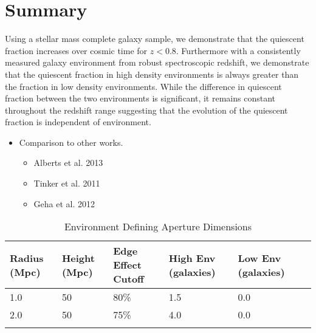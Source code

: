 \documentclass{emulateapj}
\begin{document}
\section{Summary} \label{sec:summary}
Using a stellar mass complete galaxy sample, we demonstrate that the quiescent fraction increases over cosmic time for $z < 0.8$. Furthermore with a consistently measured galaxy environment from robust spectroscopic redshift, we demonstrate that the quiescent fraction in high density environments is always greater than the fraction in low density environments. While the difference in quiescent fraction between the two environments is significant, it remains constant throughout the redshift range suggesting that the evolution of the quiescent fraction is independent of environment. 

\begin{itemize}
    \item Comparison to other works. 
    \begin{itemize}
        \item Alberts et al. 2013 
        \item Tinker et al. 2011
        \item Geha et al. 2012
    \end{itemize}
\end{itemize}

%
%


\appendix
\begin{table*} %
  \caption{Environment Defining Aperture Dimensions}
  \label{tab:aperture}
  \begin{center}
    \leavevmode
    \begin{tabular}{llllll} \hline \hline              
  Radius (Mpc)          &Height (Mpc)      & Edge Effect Cutoff &High Env (galaxies) &Low Env (galaxies) \\ \hline 
  1.0 &50 & 80\% & 1.5 & 0.0          \\
  2.0 &50 & 75\% & 4.0 & 0.0          \\ \hline
  \multicolumn{5}{l}{}                                             \\       
    \end{tabular}
  \end{center}
\end{table*}
\end{document}
